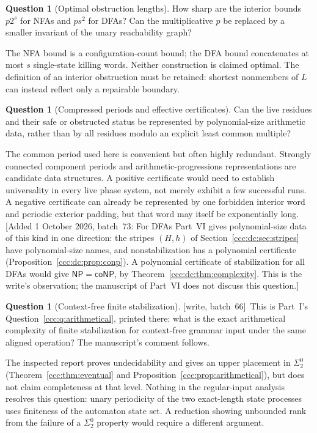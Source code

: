 \documentclass[11pt,letterpaper]{article}
\theoremstyle{definition}
\newtheorem{question}[theorem]{Question}
\theoremstyle{remark}
\newcommand{\wsix}{\textup{[write, batch~66]}}
\newcommand{\waddsevthree}[1]{\textup{[}Added 1 October 2026, batch~73: #1\textup{]}}
\newcommand{\NP}{\mathsf{NP}}
\newcommand{\coNP}{\mathsf{coNP}}
\begin{document}
\begin{question}[Optimal obstruction lengths]\label{ccc:ps:q:length}
How sharp are the interior bounds $p2^s$ for NFAs and $ps^2$ for DFAs?
Can the multiplicative $p$ be replaced by a smaller invariant of the
unary reachability graph?
\end{question}
The NFA bound is a configuration-count bound; the DFA bound concatenates
at most $s$ single-state killing words. Neither construction is claimed
optimal. The definition of an interior obstruction must be retained:
shortest nonmembers of $L$ can instead reflect only a repairable boundary.

\begin{question}[Compressed periods and effective certificates]\label{ccc:ps:q:period}
Can the live residues and their safe or obstructed status be represented
by polynomial-size arithmetic data, rather than by all residues modulo
an explicit least common multiple?
\end{question}
The common period used here is convenient but often highly redundant.
Strongly connected component periods and arithmetic-progressions
representations are candidate data structures. A positive certificate
would need to establish universality in every live phase system, not
merely exhibit a few successful runs. A negative certificate can already
be represented by one forbidden interior word and periodic exterior
padding, but that word may itself be exponentially long.
\waddsevthree{For DFAs Part~VI gives polynomial-size data of this kind in one
direction: the stripes $(H,h)$ of Section~\ref{ccc:dc:sec:stripes} have
polynomial-size names, and nonstabilization has a polynomial certificate
(Proposition~\ref{ccc:dc:prop:conp}). A polynomial certificate of
stabilization for all DFAs would give $\NP=\coNP$, by
Theorem~\ref{ccc:dc:thm:complexity}. This is the write's observation; the
manuscript of Part~VI does not discuss this question.}

\begin{question}[Context-free finite stabilization]\label{ccc:ps:q:cfg}
\wsix\ This is Part~I's Question~\ref{ccc:q:arithmetical}, printed there:
what is the exact arithmetical complexity of finite stabilization for
context-free grammar input under the same aligned operation? The
manuscript's comment follows.
\end{question}
The inspected report proves undecidability and gives an upper placement
in $\Sigma^0_2$ (Theorem~\ref{ccc:thm:eventual} and
Proposition~\ref{ccc:prop:arithmetical}), but does not claim completeness at that level. Nothing
in the regular-input analysis resolves this question: unary periodicity
of the two exact-length state processes uses finiteness of the automaton
state set. A reduction showing unbounded rank from the failure of a
$\Sigma^0_2$ property would require a different argument.
\end{document}
